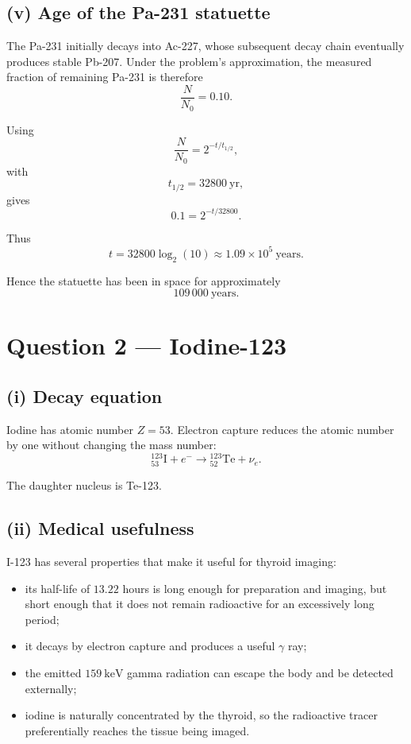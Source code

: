 \documentclass[11pt,a4paper]{article}
\begin{document}
\subsection{(v) Age of the Pa-231 statuette}

The Pa-231 initially decays into Ac-227, whose subsequent decay chain eventually
produces stable Pb-207. Under the problem's approximation, the measured fraction
of remaining Pa-231 is therefore
\[
\frac{N}{N_0}=0.10.
\]

Using
\[
\frac{N}{N_0}=2^{-t/t_{1/2}},
\]
with
\[
t_{1/2}=32800\ \mathrm{yr},
\]
gives
\[
0.1=2^{-t/32800}.
\]

Thus
\[
t
=
32800\log_2(10)
\approx
\boxed{1.09\times10^5\ \mathrm{years}}.
\]

Hence the statuette has been in space for approximately
\[
\boxed{109\,000\ \mathrm{years}}.
\]

\section{Question 2 --- Iodine-123}

\subsection{(i) Decay equation}

Iodine has atomic number $Z=53$. Electron capture reduces the atomic number by
one without changing the mass number:
\[
{}^{123}_{53}\mathrm{I}+e^-
\rightarrow
{}^{123}_{52}\mathrm{Te}+\nu_e.
\]

The daughter nucleus is Te-123.

\subsection{(ii) Medical usefulness}

I-123 has several properties that make it useful for thyroid imaging:

\begin{itemize}
    \item its half-life of $13.22$ hours is long enough for preparation and imaging,
    but short enough that it does not remain radioactive for an excessively long
    period;
    \item it decays by electron capture and produces a useful $\gamma$ ray;
    \item the emitted $159\ \mathrm{keV}$ gamma radiation can escape the body and
    be detected externally;
    \item iodine is naturally concentrated by the thyroid, so the radioactive
    tracer preferentially reaches the tissue being imaged.
\end{itemize}
\end{document}
